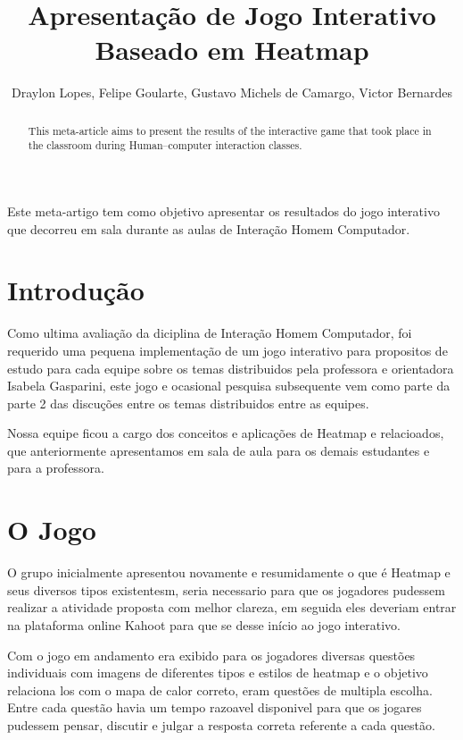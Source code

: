 \documentclass[12pt]{article}
\title{Apresentação de Jogo Interativo\\Baseado em Heatmap}
\author{Draylon Lopes\inst{1}, Felipe Goularte\inst{2}, Gustavo Michels de Camargo\inst{3}, Victor Bernardes\inst{4} }
\begin{document}
 

\maketitle

\begin{abstract}
  This meta-article aims to present the results of the interactive game that took place in the classroom during Human–computer interaction classes.
\end{abstract}
     
\begin{resumo} 
  Este meta-artigo tem como objetivo apresentar os resultados do jogo interativo que decorreu em sala durante as aulas de Interação Homem Computador.
\end{resumo}

\section{Introdução}

Como ultima avaliação da diciplina de Interação Homem Computador, foi requerido uma pequena implementação de um jogo interativo para propositos de estudo para cada equipe sobre os temas distribuidos pela professora e orientadora Isabela Gasparini, este jogo e ocasional pesquisa subsequente vem como parte da parte 2 das discuções entre os temas distribuidos entre as equipes.

Nossa equipe ficou a cargo dos conceitos e aplicações de Heatmap e relacioados, que anteriormente apresentamos em sala de aula para os demais estudantes e para a professora.


\section{O Jogo}

O grupo inicialmente apresentou novamente e resumidamente o que é Heatmap e seus diversos tipos existentesm, seria necessario para que os jogadores pudessem realizar a atividade proposta com melhor clareza, em seguida eles deveriam entrar na plataforma online Kahoot para que se desse início ao jogo interativo.

Com o jogo em andamento era exibido para os jogadores diversas questões individuais com imagens de diferentes tipos e estilos de heatmap e o objetivo relaciona los com o mapa de calor correto, eram questões de multipla escolha. Entre cada questão havia um tempo razoavel disponivel para que os jogares pudessem pensar, discutir e julgar a resposta correta referente a cada questão.
\end{document}
